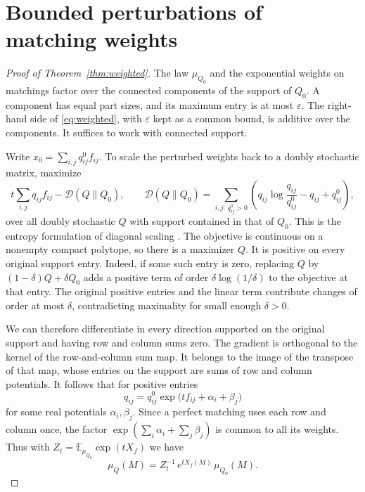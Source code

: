 \documentclass[11pt]{article}
\newcommand{\E}{\mathbb{E}}
\begin{document}
\section{Bounded perturbations of matching weights}\label{sec:tilt}

\begin{proof}[Proof of Theorem~\ref{thm:weighted}]
The law \(\mu_{Q_0}\) and the exponential weights on matchings factor over the connected components of the support of \(Q_0\). A component has equal part sizes, and its maximum entry is at most \(\varepsilon\). The right-hand side of \eqref{eq:weighted}, with \(\varepsilon\) kept as a common bound, is additive over the components. It suffices to work with connected support.

Write \(x_0=\sum_{i,j}q^0_{ij} f_{ij}\). To scale the perturbed weights back to a doubly stochastic matrix, maximize
\[
 t\sum_{i,j}q_{ij}f_{ij}-\mathcal D(Q\|Q_0),\qquad
 \mathcal D(Q\|Q_0)
 =\sum_{i,j:\,q^0_{ij}>0}
 \left(q_{ij}\log\frac{q_{ij}}{q^0_{ij}}-q_{ij}+q^0_{ij}\right),
\]
over all doubly stochastic \(Q\) with support contained in that of \(Q_0\). This is the entropy formulation of diagonal scaling \cite{SinkhornKnopp}. The objective is continuous on a nonempty compact polytope, so there is a maximizer \(Q\). It is positive on every original support entry. Indeed, if some such entry is zero, replacing \(Q\) by \((1-\delta)Q+\delta Q_0\) adds a positive term of order \(\delta\log(1/\delta)\) to the objective at that entry. The original positive entries and the linear term contribute changes of order at most \(\delta\), contradicting maximality for small enough \(\delta>0\).

We can therefore differentiate in every direction supported on the original support and having row and column sums zero. The gradient is orthogonal to the kernel of the row-and-column sum map. It belongs to the image of the transpose of that map, whose entries on the support are sums of row and column potentials. It follows that for positive entries
\[
 q_{ij}=q^0_{ij}\exp\bigl(tf_{ij}+\alpha_i+\beta_j\bigr)
\]
for some real potentials \(\alpha_i,\beta_j\). Since a perfect matching uses each row and column once, the factor \(\exp(\sum_i\alpha_i+\sum_j\beta_j)\) is common to all its weights. Thus with \(Z_t=\E_{\mu_{Q_0}}\exp(tX_f)\) we have
\begin{equation}\label{eq:mu-tilt}
 \mu_Q(M)=Z_t^{-1}\,e^{tX_f(M)}\,\mu_{Q_0}(M).
\end{equation}


\end{proof}
\end{document}
